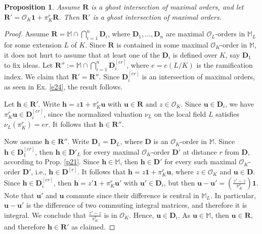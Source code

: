 \documentclass{amsart}
\newtheorem{proposition}[theorem]{Proposition}
\theoremstyle{definition}
\newcommand\alge{\mathbb{M}}
\newcommand\oink{\mathcal O}
\newcommand\Ra{\mathbf R}
\newcommand\Da{\mathbf{D}}
\begin{document}
\begin{proposition}\label{p46}
    Assume $\Ra$ is a ghost intersection of maximal orders, and
    let  $\Ra'=\oink_K\mathbf{1}+\pi_K^r\Ra$. Then $\Ra'$
    is a ghost intersection of maximal orders.
\end{proposition}

\begin{proof}
    Assume $\Ra=\alge \cap\bigcap_{i=1}^n\Da_i$,
    where $\Da_1,\dots,\Da_n$ are maximal 
    $\oink_L$-orders in $\alge_L$ for
    some extension $L$ of $K$. Since 
    $\Ra$ is contained
    in some maximal $\oink_K$-order  in $\alge$,
    it does not hurt to assume that at least one 
    of the $\Da_i$ is defined over $K$, say 
    $\Da_1$ to fix ideas. Let $\Ra'':=
    \alge \cap\bigcap_{i=1}^n\Da_i^{[er]}$,
    where $e=e(L/K)$ is the ramification index.
    We claim that $\Ra'=\Ra''$. 
    Since $\Da_i^{[er]}$ is an intersection of
    maximal orders, as seen in Ex. \ref{e24},
    the result follows. 
    
    Let $\mathbf{h}\in\Ra'$. Write
    $\mathbf{h}=z\mathbf{1}+\pi_K^r\mathbf{u}$
    with $\mathbf{u}\in\Ra$ and $z\in\oink_K$.
    Since $\mathbf{u}\in\Da_i$, we have
    $\pi_K^r\mathbf{u}\in\Da_i^{[er]}$, since the
    normalized valuation $\nu_L$ on the local 
    field $L$ satisfies
    $\nu_L\left(\pi_K^r\right)=er$.
    It follows that
    $\mathbf{h}\in\Ra''$.
    
    Now assume 
    $\mathbf{h}\in\Ra''$. Write
    $\Da_1=\Da_L$, where $\Da$ is an 
    $\oink_K$-order
    in $\alge $. Since 
    $\mathbf{h}\in\Da_1^{[er]}$,
    then $\mathbf{h}\in\Da'_L$ for 
    every maximal $\oink_K$-order 
    $\Da'$ at distance $r$ from $\Da$, 
    according to Prop. 
    \ref{p21}. Since 
    $\mathbf{h}\in\alge $, then 
    $\mathbf{h}\in\Da'$
    for every such maximal $\oink_K$-order $\Da'$,
    i.e., $\mathbf{h}\in\Da^{[r]}$. 
    It follows that 
    $\mathbf{h}=z\mathbf{1}+\pi_K^r\mathbf{u}$,
    where $z\in\oink_K$ and $\mathbf{u}\in\Da$. 
    Since
    $\mathbf{h}\in\Da_i^{[er]}$, then 
    $\mathbf{h}=z'\mathbf{1}+
    \pi_K^r\mathbf{u}'$ with
    $\mathbf{u}'\in \Da_i$, but then 
    $\mathbf{u}-\mathbf{u}'=\left(
    \frac{z'-z}{\pi_K^r}\right)\mathbf{1}$. 
    Note that $\mathbf{u}'$ and $\mathbf{u}$
    commute since their difference is central
    in $\alge_L$. In particular,
    $\mathbf{u}-\mathbf{u}'$ is the difference
     of two commuting integral matrices, and 
     therefore it is integral. We conclude that
     $\frac{z'-z}{\pi_K^r}$ is in $\oink_K$. 
     Hence, $\mathbf{u}\in \Da_i$. As 
    $\mathbf{u}\in\alge $, then 
    $\mathbf{u}\in\Ra$, and
    therefore $\mathbf{h}\in\Ra'$ as  claimed.
\end{proof}
\end{document}

